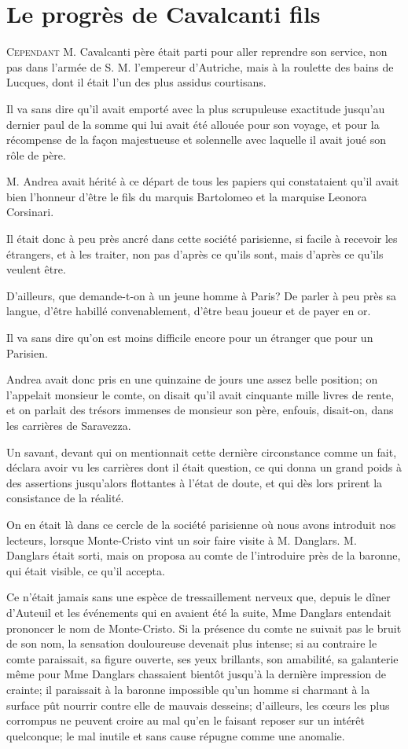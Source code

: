 \chapter{Le progrès de Cavalcanti fils}

\lettrine{C}{ependant} M. Cavalcanti père était parti pour aller reprendre son service, non pas dans l'armée de S. M. l'empereur d'Autriche, mais à la roulette des bains de Lucques, dont il était l'un des plus assidus courtisans. 

Il va sans dire qu'il avait emporté avec la plus scrupuleuse exactitude jusqu'au dernier paul de la somme qui lui avait été allouée pour son voyage, et pour la récompense de la façon majestueuse et solennelle avec laquelle il avait joué son rôle de père. 

M. Andrea avait hérité à ce départ de tous les papiers qui constataient qu'il avait bien l'honneur d'être le fils du marquis Bartolomeo et la marquise Leonora Corsinari. 

Il était donc à peu près ancré dans cette société parisienne, si facile à recevoir les étrangers, et à les traiter, non pas d'après ce qu'ils sont, mais d'après ce qu'ils veulent être. 

D'ailleurs, que demande-t-on à un jeune homme à Paris? De parler à peu près sa langue, d'être habillé convenablement, d'être beau joueur et de payer en or. 

Il va sans dire qu'on est moins difficile encore pour un étranger que pour un Parisien. 

Andrea avait donc pris en une quinzaine de jours une assez belle position; on l'appelait monsieur le comte, on disait qu'il avait cinquante mille livres de rente, et on parlait des trésors immenses de monsieur son père, enfouis, disait-on, dans les carrières de Saravezza. 

Un savant, devant qui on mentionnait cette dernière circonstance comme un fait, déclara avoir vu les carrières dont il était question, ce qui donna un grand poids à des assertions jusqu'alors flottantes à l'état de doute, et qui dès lors prirent la consistance de la réalité. 

On en était là dans ce cercle de la société parisienne où nous avons introduit nos lecteurs, lorsque Monte-Cristo vint un soir faire visite à M. Danglars. M. Danglars était sorti, mais on proposa au comte de l'introduire près de la baronne, qui était visible, ce qu'il accepta. 

Ce n'était jamais sans une espèce de tressaillement nerveux que, depuis le dîner d'Auteuil et les événements qui en avaient été la suite, Mme Danglars entendait prononcer le nom de Monte-Cristo. Si la présence du comte ne suivait pas le bruit de son nom, la sensation douloureuse devenait plus intense; si au contraire le comte paraissait, sa figure ouverte, ses yeux brillants, son amabilité, sa galanterie même pour Mme Danglars chassaient bientôt jusqu'à la dernière impression de crainte; il paraissait à la baronne impossible qu'un homme si charmant à la surface pût nourrir contre elle de mauvais desseins; d'ailleurs, les cœurs les plus corrompus ne peuvent croire au mal qu'en le faisant reposer sur un intérêt quelconque; le mal inutile et sans cause répugne comme une anomalie. 

